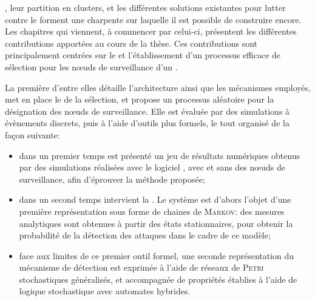 
, leur partition en clusters, et les différentes solutions existantes pour lutter contre le \dds forment une charpente sur laquelle il est possible de construire encore.
Les chapitres qui viennent, à commencer par celui-ci, présentent les différentes contributions apportées au cours de la thèse.
Ces contributions sont principalement centrées sur le  et l'établissement d'un processus efficace de sélection pour les nœuds de surveillance d'un \rc.

La première d'entre elles détaille l'architecture ainsi que les mécanismes employés, met en place le  de la sélection, et propose un processus aléatoire pour la désignation des nœuds de surveillance.
Elle est évaluée par des simulations à évènements discrets, puis à l'aide d'outils plus formels, le tout organisé de la façon suivante:
\begin{itemize}
    \item dans un premier temps est présenté un jeu de résultats numériques obtenus par des simulations réalisées avec le logiciel \nsii, avec et sans  des nœuds de surveillance, afin d'éprouver la méthode proposée;
    \item dans un second temps intervient la . Le système est d'abors l'objet d'une première représentation sous forme de chaines de \textsc{Markov}: des mesures analytiques sont obtenues à partir des états stationnaires, pour obtenir la probabilité de la détection des attaques dans le cadre de ce modèle;
    \item face aux limites de ce premier outil formel, une seconde représentation du mécanisme de détection est exprimée à l'aide de réseaux de \textsc{Petri} stochastiques généralisés, et accompagnée de propriétés établies à l'aide de logique stochastique avec automates hybrides.
\end{itemize}

